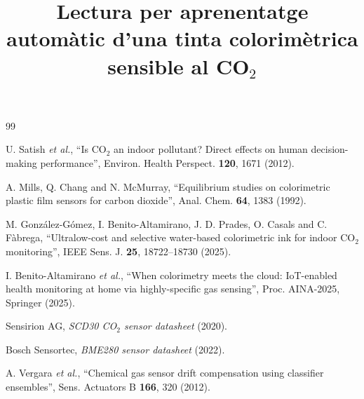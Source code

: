 \documentclass[twocolumn]{revtex4}
\begin{document}
\vspace*{-7mm}
\begin{thebibliography}{99}

 U. Satish {\it et al.}, ``Is CO$_2$ an indoor pollutant?
Direct effects on human decision-making performance'', Environ. Health
Perspect. {\bf 120}, 1671 (2012).

 A. Mills, Q. Chang and N. McMurray, ``Equilibrium studies
on colorimetric plastic film sensors for carbon dioxide'', Anal. Chem.
{\bf 64}, 1383 (1992).

 M. Gonz\'alez-G\'omez, I. Benito-Altamirano,
J. D. Prades, O. Casals and C. F\`abrega, ``Ultralow-cost and selective
water-based colorimetric ink for indoor CO$_2$ monitoring'', IEEE Sens.
J. {\bf 25}, 18722--18730 (2025).

 I. Benito-Altamirano {\it et al.}, ``When colorimetry
meets the cloud: IoT-enabled health monitoring at home via
highly-specific gas sensing'', Proc. AINA-2025, Springer (2025).

 Sensirion AG, {\it SCD30 CO$_2$ sensor datasheet}
(2020).

 Bosch Sensortec, {\it BME280 sensor datasheet} (2022).

 A. Vergara {\it et al.}, ``Chemical gas sensor
drift compensation using classifier ensembles'', Sens. Actuators B
{\bf 166}, 320 (2012).

\end{thebibliography}

\clearpage

\title{Lectura per aprenentatge autom\`atic d'una tinta colorim\`etrica
sensible al CO$_2$}
\end{document}
